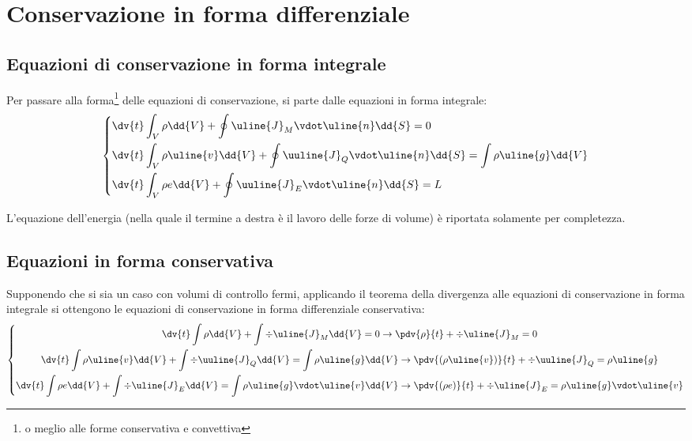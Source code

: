 %
\section{Conservazione in forma differenziale}

\subsection{Equazioni di conservazione in forma integrale} 
Per passare alla forma\footnote{o meglio alle forme conservativa e convettiva} delle equazioni di conservazione, si parte dalle equazioni in forma integrale:
%
	\begin{equation*}
		\left\{
		\begin{aligned}
			&\dv{t} \int_V \rho \dd{V} + \oint \uline{J}_M \vdot \uline{n} \dd{S} = 0 \\
			&\dv{t} \int_V \rho \uline{v} \dd{V} + \oint \uuline{J}_Q \vdot \uline{n} \dd{S} = \int \rho \uline{g} \dd{V} \\
			&\dv{t} \int_V \rho e \dd{V} + \oint \uuline{J}_E \vdot \uline{n} \dd{S} = L 
		\end{aligned}
		\right.
	\end{equation*}
%

L'equazione dell'energia (nella quale il termine a destra è il lavoro delle forze di volume) è riportata solamente per completezza.

\subsection{Equazioni in forma conservativa}
Supponendo che si sia un caso con volumi di controllo fermi, applicando il teorema della divergenza alle equazioni di conservazione in forma integrale si ottengono le equazioni di conservazione in forma differenziale conservativa:
	\begin{equation*}
		\left\{
		\begin{gathered}
			\dv{t} \int \rho \dd{V} + \int \div{\uline{J}_M} \dd{V} = 0 \rightarrow \pdv{\rho}{t} + \div{\uline{J}_M} = 0 \\
			\dv{t} \int \rho \uline{v} \dd{V} + \int \div{\uuline{J}_Q} \dd{V} = \int \rho \uline{g} \dd{V} \rightarrow \pdv{(\rho \uline{v})}{t} + \div{\uuline{J}_Q} = \rho \uline{g} \\
			\dv{t} \int \rho e \dd{V} + \int \div{\uline{J}_E} \dd{V} = \int \rho \uline{g} \vdot \uline{v} \dd{V} \rightarrow \pdv{(\rho e)}{t} + \div{\uline{J}_E} = \rho \uline{g} \vdot \uline {v} 
		\end{gathered}
		\right.
	\end{equation*}

